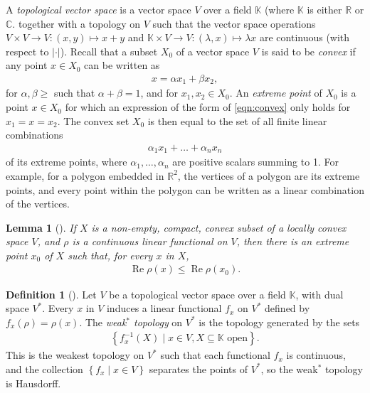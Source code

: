 \documentclass[11pt,a4paper]{report}
\theoremstyle{plain}
\newtheorem{lemma}{Lemma}
\theoremstyle{definition}
\newtheorem*{defn*}{Definition}
\newcommand{\1}{\mathbbm{1}}
\newcommand{\C}{\mathbb{C}}
\newcommand{\R}{\mathbb{R}}
\DeclareMathOperator{\Real}{\operatorname{Re}}
\begin{document}
A \emph{topological vector space} is a vector space $V$ over a field 
$\mathbb{K}$ (where $\mathbb{K}$ is either $\R$ or $\C$.
together with a topology on $V$ such that the vector space operations $V\times 
V\to V:(x,y)\mapsto x+y$ and $\mathbb{K}\times V\to V:(\lambda,x)\mapsto \lambda 
x$ are continuous (with respect to $\left|\cdot\right|$). 
Recall that a subset $X_0$ of a vector space $V$ is said to be 
\emph{convex} if any point $x \in X_0$ can be written as 
\begin{align}\label{eqn:convex}
	x = \alpha x_1 +\beta x_2,
\end{align}
for $\alpha,\beta\geq$ such that $\alpha+\beta=1$, and for $x_1,x_2\in X_0$.
An \emph{extreme point} of $X_0$ is a point $x \in X_0$ for which an expression 
of the form of \eqref{eqn:convex} only holds for $x_1 = x = x_2$.
The convex set $X_0$ is then equal to the set of all  finite linear combinations
\begin{align*}
	\alpha_1 x_1+\dots +\alpha_n x_n
\end{align*}
of its extreme points, where $\alpha_1,\dots,\alpha_n$ are positive scalars 
summing to 1. For example, for a polygon embedded in $\R^2$, the vertices of a 
polygon are its extreme points, and every point within the polygon can be 
written as a linear combination of the vertices.


\begin{lemma}[{\cite[1.4.4]{kadison83}}]\label{lemma:144}
If $X$ is a non-empty, compact, convex subset of a locally convex space $V$, and 
$\rho$ is a continuous linear functional on $V$, then there is an extreme point 
$x_0$ of $X$ such that, for every $x$ in $X$,
	\begin{align*}
		\Real\rho(x) \leq \Real\rho(x_0).
	\end{align*}
\end{lemma}

\begin{defn*}[{\cite[3.14]{rudin91}}]
	Let $V$ be a topological vector space over a field $\mathbb K$, with dual 
	space $V^\ast$. Every $x$ in $V$ induces a linear functional $f_x$ on $V^\ast$ 
	defined by $f_x(\rho)=\rho(x)$. The \emph{weak$^\ast$ topology} on $V^\ast$ is 
	the topology generated by the sets 
	\begin{align*}
		\left\{f^{-1}_x(X) \mid x \in V, X\subseteq \mathbb K \mbox{ open}\right\}.
	\end{align*}
	This is the weakest topology on $V^\ast$ such that each functional $f_x$ is 
	continuous, and the collection $\left\{f_x \mid x\in V\right\}$ separates the 
	points of $V^\ast$, so the weak$^\ast$ topology is Hausdorff.
\end{defn*}
\end{document}
